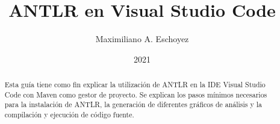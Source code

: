 \documentclass[a5paper,10pt]{article}
\author{Maximiliano A. Eschoyez}
\title{ANTLR en Visual Studio Code}
\date{2021}
\begin{document}
\maketitle

\newcommand{\python}{false}


\begin{abstract}
	Esta guía tiene como fin explicar la utilización de ANTLR en la IDE Visual Studio Code con Maven como gestor de proyecto.  Se explican los pasos mínimos necesarios para la instalación de ANTLR, la generación de diferentes gráficos de análisis y la compilación y ejecución de código fuente.
\end{abstract}



\clearpage




\end{document}
